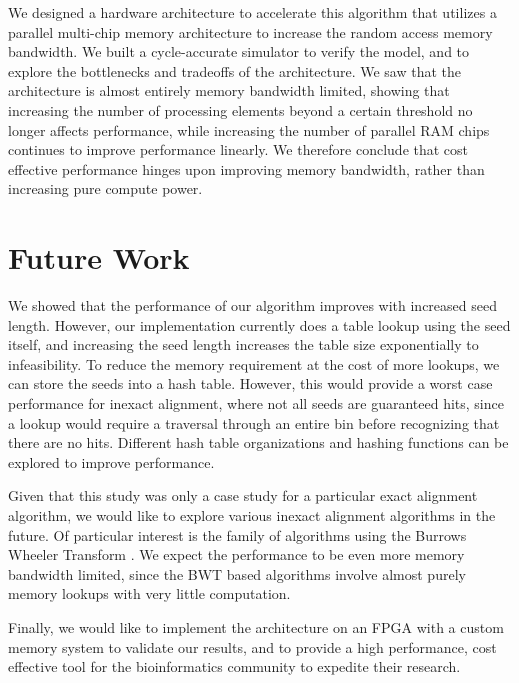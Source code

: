 \documentclass[11pt]{article}
\begin{document}
We designed a hardware architecture to accelerate this algorithm that utilizes a parallel multi-chip memory architecture to increase the random access memory bandwidth.  We built a cycle-accurate simulator to verify the model, and to explore the bottlenecks and tradeoffs of the architecture.  We saw that the architecture is almost entirely memory bandwidth limited, showing that increasing the number of processing elements beyond a certain threshold no longer affects performance, while increasing the number of parallel RAM chips continues to improve performance linearly.  We therefore conclude that cost effective performance hinges upon improving memory bandwidth, rather than increasing pure compute power.

\section{Future Work}

We showed that the performance of our algorithm improves with increased seed length.  However, our implementation currently does a table lookup using the seed itself, and increasing the seed length increases the table size exponentially to infeasibility.  To reduce the memory requirement at the cost of more lookups, we can store the seeds into a hash table.  However, this would provide a worst case performance for inexact alignment, where not all seeds are guaranteed hits, since a lookup would require a traversal through an entire bin before recognizing that there are no hits.  Different hash table organizations and hashing functions can be explored to improve performance.


Given that this study was only a case study for a particular exact alignment algorithm, we would like to explore various inexact alignment algorithms in the future.  Of particular interest is the family of algorithms using the Burrows Wheeler Transform \cite{li2009fast}.  We expect the performance to be even more memory bandwidth limited, since the BWT based algorithms involve almost purely memory lookups with very little computation.


Finally, we would like to implement the architecture on an FPGA with a custom memory system to validate our results, and to provide a high performance, cost effective tool for the bioinformatics community to expedite their research.





{
  
}
\end{document}
